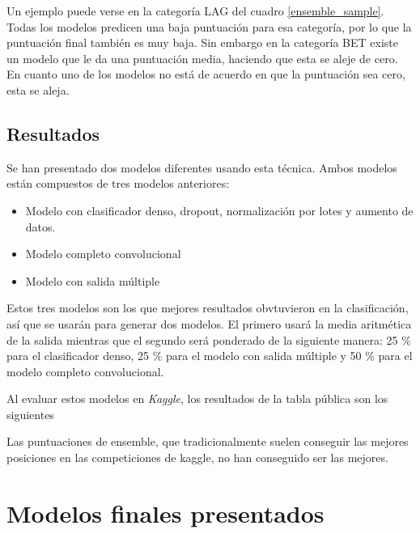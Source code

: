 \begin{itemize}
Un ejemplo puede verse en la categoría LAG del cuadro \ref{ensemble_sample}.
Todas los modelos predicen una baja puntuación para esa categoría, por lo que la
puntuación final también es muy baja. Sin embargo en la categoría BET existe un
modelo que le da una puntuación media, haciendo que esta se aleje de cero. En
cuanto uno de los modelos no está de acuerdo en que la puntuación sea cero, esta
se aleja.

\subsection{Resultados}

Se han presentado dos modelos diferentes usando esta técnica. Ambos modelos
están compuestos de tres modelos anteriores:

\begin{itemize}
    \item{Modelo con clasificador denso, dropout, normalización por lotes y
        aumento de datos.}
    \item{Modelo completo convolucional}
    \item{Modelo con salida múltiple}
\end{itemize}

Estos tres modelos son los que mejores resultados obvtuvieron en la
clasificación, así que se usarán para generar dos modelos. El primero usará la
media aritmética de la salida mientras que el segundo será ponderado de la
siguiente manera: 25 \% para el clasificador denso, 25 \% para el modelo con
salida múltiple y 50 \% para el modelo completo convolucional.

Al evaluar estos modelos en \textit{Kaggle}, los resultados de la tabla pública
son los siguientes

\begin{itemize}
    \item{Media aritmética sobre los tres modelos: \textbf{0.9175}
    \item{Media ponderada favoreciendo el modelo completo convolucional: \textbf{0.8975}
\end{itemize}

Las puntuaciones de ensemble, que tradicionalmente suelen conseguir las mejores posiciones en las competiciones de kaggle, no han conseguido ser las mejores.

\section{Modelos finales presentados}


\end{itemize}
